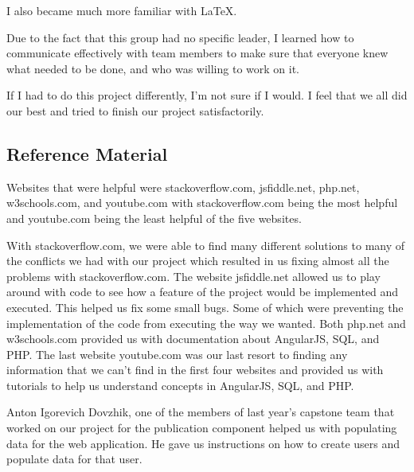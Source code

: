 \documentclass[onecolumn]{IEEEtran}
\begin{document}
I also became much more familiar with \LaTeX.

Due to the fact that this group had no specific leader, I learned how to communicate effectively with team members to make sure that everyone knew what needed to be done, and who was willing to work on it.  

If I had to do this project differently, I'm not sure if I would. I feel that we all did our best and tried to finish our project satisfactorily.  

\subsection{Reference Material}
Websites that were helpful were stackoverflow.com, jsfiddle.net, php.net, w3schools.com, and youtube.com with stackoverflow.com being the most helpful and youtube.com being the least helpful of the five websites.  

With stackoverflow.com, we were able to find many different solutions to many of the conflicts we had with our project which resulted in us fixing almost all the problems with stackoverflow.com. The website jsfiddle.net allowed us to play around with code to see how a feature of the project would be implemented and executed. This helped us fix some small bugs. Some of which were preventing the implementation of the code from executing the way we wanted. Both php.net and w3schools.com provided us with documentation about AngularJS, SQL, and PHP. The last website youtube.com was our last resort to finding any information that we can't find in the first four websites and provided us with tutorials to help us understand concepts in AngularJS, SQL, and PHP.  

Anton Igorevich Dovzhik, one of the members of last year's capstone team that worked on our project for the publication component helped us with populating data for the web application. He gave us instructions on how to create users and populate data for that user.  
\end{document}

